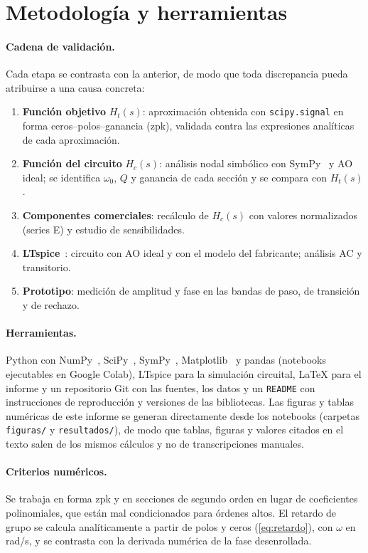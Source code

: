 \section{Metodología y herramientas}
\label{sec:metodologia}

\paragraph{Cadena de validación.} Cada etapa se contrasta con la anterior, de modo que toda discrepancia pueda atribuirse a una causa
concreta:
\begin{enumerate}
  \item \textbf{Función objetivo} $H_t(s)$: aproximación obtenida con \texttt{scipy.signal} en forma ceros--polos--ganancia (zpk),
        validada contra las expresiones analíticas de cada aproximación.
  \item \textbf{Función del circuito} $H_c(s)$: análisis nodal simbólico con SymPy~\cite{meurer2017} y AO ideal; se identifica
        $\omega_0$, $Q$ y ganancia de cada sección y se compara con $H_t(s)$.
  \item \textbf{Componentes comerciales}: recálculo de $H_c(s)$ con valores normalizados (series E) y estudio de sensibilidades.
  \item \textbf{LTspice}~\cite{ltspice}: circuito con AO ideal y con el modelo del fabricante; análisis AC y transitorio.
  \item \textbf{Prototipo}: medición de amplitud y fase en las bandas de paso, de transición y de rechazo.
\end{enumerate}

\paragraph{Herramientas.} Python con NumPy~\cite{harris2020}, SciPy~\cite{virtanen2020}, SymPy~\cite{meurer2017},
Matplotlib~\cite{hunter2007} y pandas (notebooks ejecutables en Google Colab), LTspice para la simulación circuital, \LaTeX{} para el
informe y un repositorio Git con las fuentes, los datos y un \texttt{README} con instrucciones de reproducción y versiones de las
bibliotecas. Las figuras y tablas numéricas de este informe se generan directamente desde los notebooks (carpetas
\texttt{figuras/} y \texttt{resultados/}), de modo que tablas, figuras y valores citados en el texto salen de los mismos cálculos y no de transcripciones manuales.

\paragraph{Criterios numéricos.} Se trabaja en forma zpk y en secciones de segundo orden en lugar de coeficientes polinomiales, que
están mal condicionados para órdenes altos. El retardo de grupo se calcula analíticamente a partir de polos y ceros
(\cref{eq:retardo}), con $\omega$ en rad/s, y se contrasta con la derivada numérica de la fase desenrollada.
